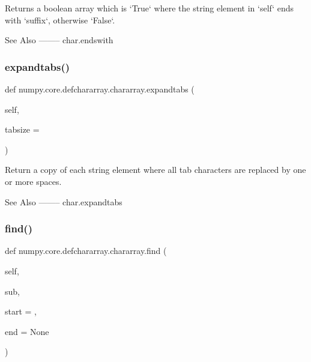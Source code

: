 \begin{DoxyVerb}Returns a boolean array which is `True` where the string element
in `self` ends with `suffix`, otherwise `False`.

See Also
--------
char.endswith\end{DoxyVerb}
 \mbox{\label{classnumpy_1_1core_1_1defchararray_1_1chararray_a778354eb0f7721623fb1379cc3d6c750}} 
\subsubsection{\texorpdfstring{expandtabs()}{expandtabs()}}
{\footnotesize\ttfamily def numpy.\+core.\+defchararray.\+chararray.\+expandtabs (\begin{DoxyParamCaption}\item[{}]{self,  }\item[{}]{tabsize = {} }\end{DoxyParamCaption})}

\begin{DoxyVerb}Return a copy of each string element where all tab characters are
replaced by one or more spaces.

See Also
--------
char.expandtabs\end{DoxyVerb}
 \mbox{\label{classnumpy_1_1core_1_1defchararray_1_1chararray_a85d762659348568583781462e817637f}} 
\subsubsection{\texorpdfstring{find()}{find()}}
{\footnotesize\ttfamily def numpy.\+core.\+defchararray.\+chararray.\+find (\begin{DoxyParamCaption}\item[{}]{self,  }\item[{}]{sub,  }\item[{}]{start = {},  }\item[{}]{end = {\ttfamily None} }\end{DoxyParamCaption})}

